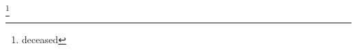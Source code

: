 \author{D. Meekins}
\affiliation{\JLAB}
\author{Z. Meziani}
\affiliation{\Temple}
\author{R. Michaels}
\affiliation{\JLAB}
\author{M. Mihovilovic}
\affiliation{\Jozef}
\author{N. Muangma}
\affiliation{\MIT}
\author{C. Munoz Camacho}
\affiliation{\France}
\author{B. Norum}
\affiliation{\Virginia}
\author{Nuruzzaman}
\affiliation{\Mississippi}
\author{K. Pan}
\affiliation{\MIT}
\author{S. Phillips}
\affiliation{\Hampshire}
\author{E. Piasetzky}
\affiliation{\TLV}
\author{I. Pomerantz}
\affiliation{\TLV}
\affiliation{\Austin}
\author{M. Posik}
\affiliation{\Temple}
\author{V. Punjabi}
\affiliation{\Norfolk}	
\author{X. Qian}
\affiliation{\Duke}	
\author{Y. Qiang}
\affiliation{\JLAB}
\author{X. Qiu}
\affiliation{\Lanzhou}
\author{P.~E. Reimer}
\affiliation{\Argonne}
\author{A. Rakhman}
\affiliation{\Syracuse}
\author{S. Riordan}
\affiliation{\Virginia}
\affiliation{\Massachusetts}
\author{G. Ron}
\affiliation{\Hebrew}
\author{O. Rondon-Aramayo}
\affiliation{\Virginia}
\author{A. Saha}
\thanks{deceased}
\affiliation{\JLAB}
\author{L. Selvy}
\affiliation{\KENT}
\author{A. Shahinyan}
\affiliation{\Yerevan}
\author{R. Shneor}
\affiliation{\TLV}
\author{S. Sirca}
\affiliation{\Ljubljana}
\author{K. Slifer}
\affiliation{\Hampshire}
\author{N. Sparveris}
\affiliation{\Temple}	
\author{R. Subedi}
\affiliation{\Virginia}
\author{V. Sulkosky}
\affiliation{\MIT}
\author{D. Wang}
\affiliation{\Virginia}
\author{J.~W. Watson}
\affiliation{\KENT}
\author{L.~B. Weinstein}
\affiliation{\DOMINION}
\author{B. Wojtsekhowski}
\affiliation{\JLAB}
\author{S.~A. Wood}
\affiliation{\JLAB}
\author{I. Yaron}
\affiliation{\TLV}
\author{X. Zhan}
\affiliation{\Argonne}
\author{J. Zhang}
\affiliation{\JLAB}
\author{Y.~W. Zhang}
\affiliation{\Rutgers}
\author{B. Zhao}
\affiliation{\William}
\author{X. Zheng}
\affiliation{\Virginia}
\author{P. Zhu}
\affiliation{\Hefei}
\author{R. Zielinski}
\affiliation{\Hampshire}	


